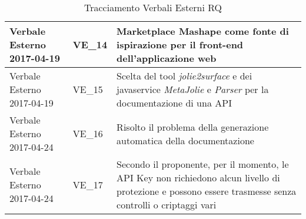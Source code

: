 \begin{table}[H]
\begin{center}
\begin{tabular}{|p{5.5cm} |p{2.5cm}| p{7cm}|}
			\hline
			Verbale Esterno 2017-04-19 & VE\_14	&  Marketplace Mashape come fonte di ispirazione per il front-end dell'applicazione web \\
			\hline
			Verbale Esterno 2017-04-19 & VE\_15 &  Scelta del tool \textit{jolie2surface} e dei javaservice \textit{MetaJolie} e \textit{Parser} per la documentazione di una API\\
			\hline
			Verbale Esterno 2017-04-24 & VE\_16	&  Risolto il problema della generazione automatica della documentazione \\
			\hline
			Verbale Esterno 2017-04-24 & VE\_17 & Secondo il proponente, per il momento, le API Key non richiedono alcun livello di protezione e possono essere trasmesse senza controlli o criptaggi vari \\
			\hline
		\end{tabular}
		\caption{Tracciamento Verbali Esterni RQ}
	\end{center}
\end{table}